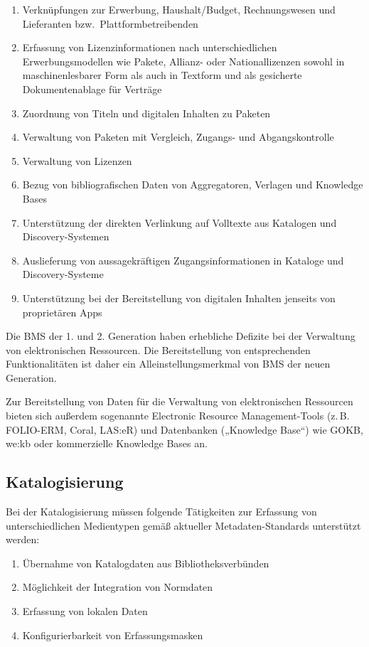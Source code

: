 \documentclass[
  11pt,
  letterpaper,
  DIV=11,
  twoside]{scrreprt}
\begin{document}
\begin{enumerate}
\def\labelenumi{\arabic{enumi}.}
\item
  Verknüpfungen zur Erwerbung, Haushalt/Budget, Rechnungswesen und
  Lieferanten bzw.~Plattformbetreibenden
\item
  Erfassung von Lizenzinformationen nach unterschiedlichen
  Erwerbungsmodellen wie Pakete, Allianz- oder Nationallizenzen sowohl
  in maschinenlesbarer Form als auch in Textform und als gesicherte
  Dokumentenablage für Verträge
\item
  Zuordnung von Titeln und digitalen Inhalten zu Paketen
\item
  Verwaltung von Paketen mit Vergleich, Zugangs- und Abgangskontrolle
\item
  Verwaltung von Lizenzen
\item
  Bezug von bibliografischen Daten von Aggregatoren, Verlagen und
  Knowledge Bases
\item
  Unterstützung der direkten Verlinkung auf Volltexte aus Katalogen und
  Discovery-Systemen
\item
  Auslieferung von aussagekräftigen Zugangsinformationen in Kataloge und
  Discovery-Systeme
\item
  Unterstützung bei der Bereitstellung von digitalen Inhalten jenseits
  von proprietären Apps
\end{enumerate}

Die BMS der 1. und 2. Generation haben erhebliche Defizite bei der
Verwaltung von elektronischen Ressourcen. Die Bereitstellung von
entsprechenden Funktionalitäten ist daher ein Alleinstellungsmerkmal von
BMS der neuen Generation.

Zur Bereitstellung von Daten für die Verwaltung von elektronischen
Ressourcen bieten sich außerdem sogenannte Electronic Resource
Management-Tools (z.\,B. FOLIO-ERM, Coral, LAS:eR) und Datenbanken
(„Knowledge Base``) wie GOKB, we:kb oder kommerzielle Knowledge Bases
an.

\subsection{Katalogisierung}\label{katalogisierung-prozess}

Bei der Katalogisierung müssen folgende Tätigkeiten zur Erfassung von
unterschiedlichen Medientypen gemäß aktueller Metadaten-Standards
unterstützt werden:

\begin{enumerate}
\def\labelenumi{\arabic{enumi}.}
\item
  Übernahme von Katalogdaten aus Bibliotheksverbünden
\item
  Möglichkeit der Integration von Normdaten
\item
  Erfassung von lokalen Daten
\item
  Konfigurierbarkeit von Erfassungsmasken
\end{enumerate}
\end{document}
